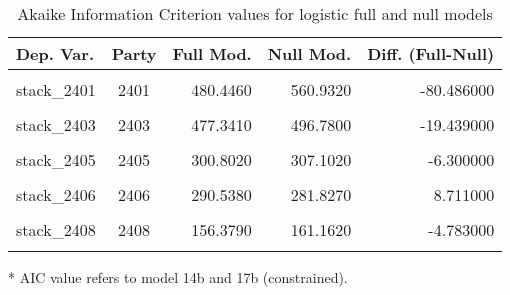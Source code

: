 \documentclass[
]{article}
\begin{document}
\begin{table}[!h]

\caption{\label{tab:unnamed-chunk-165}Akaike Information Criterion values for logistic full and null models 
        \label{table:logit_aic_si}}
\centering
\begin{threeparttable}
\begin{tabular}[t]{lcrrr}
\toprule
Dep. Var. & Party & Full Mod. & Null Mod. & Diff. (Full-Null)\\
\midrule
\cellcolor{gray!6}{stack\_2408*} & \cellcolor{gray!6}{2408} & \cellcolor{gray!6}{154.8392} & \cellcolor{gray!6}{161.1619} & \cellcolor{gray!6}{-6.322664}\\
stack\_2401 & 2401 & 480.4460 & 560.9320 & -80.486000\\
\cellcolor{gray!6}{stack\_2402} & \cellcolor{gray!6}{2402} & \cellcolor{gray!6}{649.8930} & \cellcolor{gray!6}{647.8300} & \cellcolor{gray!6}{2.063000}\\
stack\_2403 & 2403 & 477.3410 & 496.7800 & -19.439000\\
\cellcolor{gray!6}{stack\_2404} & \cellcolor{gray!6}{2404} & \cellcolor{gray!6}{214.6000} & \cellcolor{gray!6}{221.0530} & \cellcolor{gray!6}{-6.454000}\\
\addlinespace
stack\_2405 & 2405 & 300.8020 & 307.1020 & -6.300000\\
\cellcolor{gray!6}{stack\_2405*} & \cellcolor{gray!6}{2405} & \cellcolor{gray!6}{302.3458} & \cellcolor{gray!6}{307.1019} & \cellcolor{gray!6}{-4.756039}\\
stack\_2406 & 2406 & 290.5380 & 281.8270 & 8.711000\\
\cellcolor{gray!6}{stack\_2407} & \cellcolor{gray!6}{2407} & \cellcolor{gray!6}{104.2410} & \cellcolor{gray!6}{101.9590} & \cellcolor{gray!6}{2.282000}\\
stack\_2408 & 2408 & 156.3790 & 161.1620 & -4.783000\\
\addlinespace
\cellcolor{gray!6}{stack\_2409} & \cellcolor{gray!6}{2409} & \cellcolor{gray!6}{132.8190} & \cellcolor{gray!6}{128.3320} & \cellcolor{gray!6}{4.486000}\\
\bottomrule
\end{tabular}
\begin{tablenotes}[para]
\item[*] AIC value refers to model 14b and 17b (constrained).
\end{tablenotes}
\end{threeparttable}
\end{table}
\end{document}
